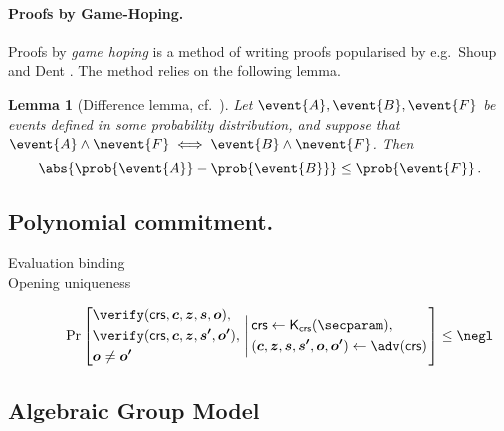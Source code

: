 \documentclass[runningheads,11pt]{llncs}
\let\spvec\vec
\let\vec\accentvec
\let\vec\spvec
\def\vec#1{\mathchoice{\mbox{\boldmath$\displaystyle#1$}}
	{\mbox{\boldmath$\textstyle#1$}}
	{\mbox{\boldmath$\scriptstyle#1$}}
	{\mbox{\boldmath$\scriptscriptstyle#1$}}}
\newtheorem{lemma}[theorem]{Lemma}
\theoremstyle{definition}
\begin{document}
\paragraph{Proofs by Game-Hoping.}
Proofs by \emph{game hoping} is a method of writing proofs popularised by e.g.~Shoup \cite{EPRINT:Shoup04} and Dent \cite{EPRINT:Dent06c}. The method relies on the following lemma.

\begin{lemma}[Difference lemma,  cf.~{\cite[Lemma 1]{EPRINT:Shoup04}}]
	\label{lem:difference_lemma}
	Let $\event{A}, \event{B}, \event{F}$ be events defined in some probability distribution, and suppose that $\event{A} \land \nevent{F} \iff \event{B} \land \nevent{F}$. 
	Then 
	\[
		\abs{\prob{\event{A}} - \prob{\event{B}}} \leq \prob{\event{F}}\,.
	\]
\end{lemma}

\subsection{Polynomial commitment.}
\label{sec:poly_com}

\begin{description}
	\item[Evaluation binding]
	\item[Opening uniqueness] 
	\[
		\Pr
			\left[
			\begin{aligned}
				& \verify(\crs, \vec{c}, \vec{z}, \vec{s}, \vec{o}),  \\ 
				& \verify(\crs, \vec{c}, \vec{z}, \vec{s'}, \vec{o'}), \\
				& \vec{o} \neq \vec{o'}
			\end{aligned}
			\,\left|\,
			\begin{aligned}
				& \crs \gets \kcrs(\secparam),\\
				& (\vec{c}, \vec{z}, \vec{s}, \vec{s'}, \vec{o}, \vec{o'}) \gets \adv(\crs)
			\end{aligned}
			\right.\right] \leq \negl
	\]
\end{description}

\subsection{Algebraic Group Model}



\subsection{}
\end{document}
